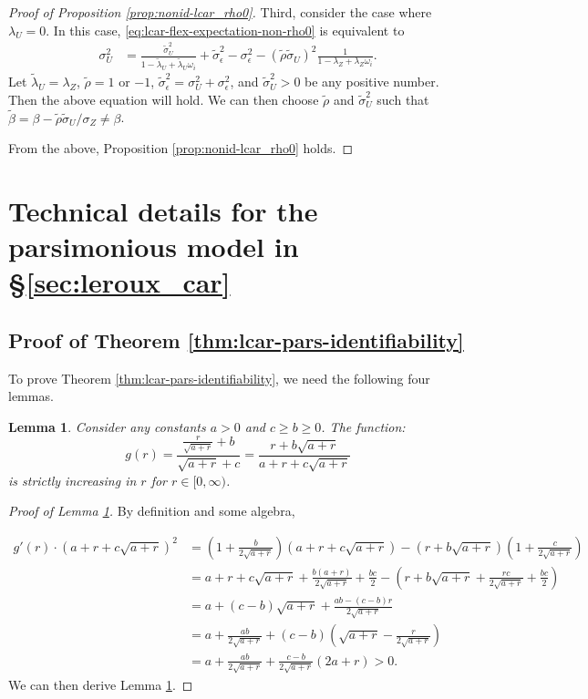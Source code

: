 \documentclass[11pt]{article}
\newtheorem{lemma}{Lemma}
\theoremstyle{definition}
\theoremstyle{remark}
\begin{document}
\begin{proof}[Proof of Proposition \ref{prop:nonid-lcar_rho0}]
Third, consider the case where $\lambda_U = 0$.  In this case, 
\eqref{eq:lcar-flex-expectation-non-rho0} is equivalent to 
\begin{align*}
\sigma_U^2  
& = \frac{\tilde\sigma_U^2}{1-\tilde\lambda_U + \tilde\lambda_U \omega_i} + \tilde\sigma_\epsilon^2 - \sigma_\epsilon^2
- (\tilde\rho\tilde\sigma_U)^2 \frac{1}{1-\lambda_Z+\lambda_Z \omega_i}.
\end{align*}
Let $\tilde\lambda_U = \lambda_Z$,  $\tilde{\rho} = 1$ or $-1$, 
$\tilde\sigma_\epsilon^2 = \sigma_U^2 + \sigma_\epsilon^2$, 
and $\tilde\sigma_U^2 > 0$ be any positive number. Then the above equation will hold. We can then choose $\tilde{\rho}$ and $\tilde\sigma_U^2$ such that $\tilde\beta = \beta - \tilde\rho \tilde\sigma_U/\sigma_Z \ne \beta$. 

From the above, Proposition \ref{prop:nonid-lcar_rho0} holds. 
\end{proof}


\section{Technical details for the parsimonious model in \S \ref{sec:leroux_car}}\label{sec:proofs-lcar-pars}

\subsection{Proof of Theorem \ref{thm:lcar-pars-identifiability}}
To prove Theorem \ref{thm:lcar-pars-identifiability}, we need the following four lemmas. 

\begin{lemma}\label{lem:lcar-pars-strictly-increasing}
Consider any constants $a>0$ and $c\ge b \ge 0$. The function:
\[
g(r) = \frac{\frac{r}{\sqrt{a+r}}+b}{\sqrt{a+r}+c}
= \frac{r+b\sqrt{a+r}}{a+r+c\sqrt{a+r}}
\]
is strictly increasing in $r$ for $r\in[0,\infty)$.
\end{lemma}
\begin{proof}[Proof of Lemma \ref{lem:lcar-pars-strictly-increasing}]

By definition and some algebra, 

\begin{align*}
g'(r)\cdot (a+r+c\sqrt{a+r})^2 &= (1+\frac{b}{2\sqrt{a+r}})(a+r+c\sqrt{a+r}) - (r+b\sqrt{a+r})(1+\frac{c}{2\sqrt{a+r}}) \\
&=a+r+c\sqrt{a+r} + \frac{b(a+r)}{2\sqrt{a+r}} + \frac{bc}{2} - \left( r+b\sqrt{a+r} + \frac{rc}{2\sqrt{a+r}} + \frac{bc}{2} \right) \\
&= a+(c-b)\sqrt{a+r} + \frac{ab-(c-b)r}{2\sqrt{a+r}}\\
&= a+\frac{ab}{2\sqrt{a+r}} + (c-b)\left( \sqrt{a+r}-\frac{r}{2\sqrt{a+r}} \right) \\
&= a + \frac{ab}{2\sqrt{a+r}} + \frac{c-b}{2\sqrt{a+r}}(2a+r) >0.
\end{align*} 
We can then derive Lemma \ref{lem:lcar-pars-strictly-increasing}. 
\end{proof}
\end{document}
